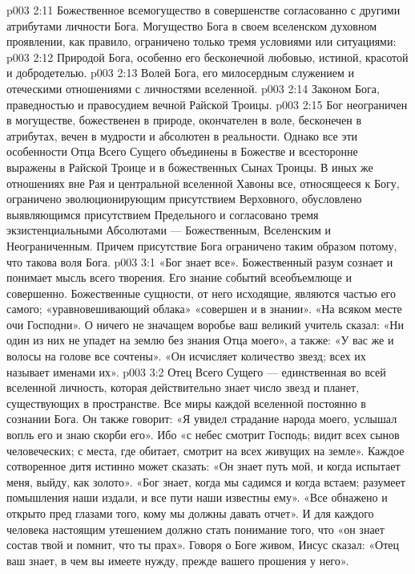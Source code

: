 \vs p003 2:11 \pc Божественное всемогущество в совершенстве согласованно с другими атрибутами личности Бога. Могущество Бога в своем вселенском духовном проявлении, как правило, ограничено только тремя условиями или ситуациями:
\vs p003 2:12 \bibnobreakspace Природой Бога, особенно его бесконечной любовью, истиной, красотой и добродетелью.
\vs p003 2:13 \bibnobreakspace Волей Бога, его милосердным служением и отеческими отношениями с личностями вселенной.
\vs p003 2:14 \bibnobreakspace Законом Бога, праведностью и правосудием вечной Райской Троицы.
\vs p003 2:15 \pc Бог неограничен в могуществе, божественен в природе, окончателен в воле, бесконечен в атрибутах, вечен в мудрости и абсолютен в реальности. Однако все эти особенности Отца Всего Сущего объединены в Божестве и всесторонне выражены в Райской Троице и в божественных Сынах Троицы. В иных же отношениях вне Рая и центральной вселенной Хавоны все, относящееся к Богу, ограничено эволюционирующим присутствием Верховного, обусловлено выявляющимся присутствием Предельного и согласовано тремя экзистенциальными Абсолютами --- Божественным, Вселенским и Неограниченным. Причем присутствие Бога ограничено таким образом потому, что такова воля Бога.
\vs p003 3:1 «Бог знает все». Божественный разум сознает и понимает мысль всего творения. Его знание событий всеобъемлюще и совершенно. Божественные сущности, от него исходящие, являются частью его самого; «уравновешивающий облака» «совершен и в знании». «На всяком месте очи Господни». О ничего не значащем воробье ваш великий учитель сказал: «Ни один из них не упадет на землю без знания Отца моего», а также: «У вас же и волосы на голове все сочтены». «Он исчисляет количество звезд; всех их называет именами их».
\vs p003 3:2 Отец Всего Сущего --- единственная во всей вселенной личность, которая действительно знает число звезд и планет, существующих в пространстве. Все миры каждой вселенной постоянно в сознании Бога. Он также говорит: «Я увидел страдание народа моего, услышал вопль его и знаю скорби его». Ибо «с небес смотрит Господь; видит всех сынов человеческих; с места, где обитает, смотрит на всех живущих на земле». Каждое сотворенное дитя истинно может сказать: «Он знает путь мой, и когда испытает меня, выйду, как золото». «Бог знает, когда мы садимся и когда встаем; разумеет помышления наши издали, и все пути наши известны ему». «Все обнажено и открыто пред глазами того, кому мы должны давать отчет». И для каждого человека настоящим утешением должно стать понимание того, что «он знает состав твой и помнит, что ты прах». Говоря о Боге живом, Иисус сказал: «Отец ваш знает, в чем вы имеете нужду, прежде вашего прошения у него».
